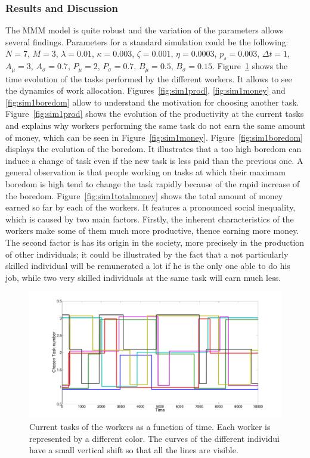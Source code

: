 \subsubsection{Results and Discussion}
The MMM model is quite robust and the variation of the parameters allows several findings. 
Parameters for a standard simulation could be the following: $N=7$, $M=3$, $\lambda=0.01$, $\kappa=0.003$, $\zeta=0.001$, $\eta=0.0003$, $p_s=0.003$, $\Delta t=1$, $A_\mu=3$, $A_\sigma=0.7$, $P_\mu=2$, $P_\sigma=0.7$, $B_\mu=0.5$, $B_\sigma=0.15$. Figure~\ref{fig:sim1task} shows the time evolution of the tasks performed by the different workers. It allows to see the dynamics of work allocation. Figures~\ref{fig:sim1prod}, \ref{fig:sim1money} and \ref{fig:sim1boredom} allow to understand the motivation for choosing another task. Figure~\ref{fig:sim1prod} shows the evolution of the productivity at the current tasks and explains why workers performing the same task do not earn the same amount of money, which can be seen in Figure~\ref{fig:sim1money}. Figure~\ref{fig:sim1boredom} displays the evolution of the boredom. It illustrates that a too high boredom can induce a change of task even if the new task is less paid than the previous one. A general observation is that people working on tasks at which their maximam boredom is high tend to change the task rapidly because of the rapid increase of the boredom. Figure~\ref{fig:sim1totalmoney} shows the total amount of money earned so far by each of the workers. It features a pronounced social inequality, which is caused by two main factors. Firstly, the inherent characteristics of the workers make some of them much more productive, thence earning more money. The second factor is has its origin in the society, more precisely in the production of other individuals; it could be illustrated by the fact that a not particularly skilled individual will be remunerated a lot if he is the only one able to do his job, while two very skilled individuals at the same task will earn much less.

\begin{figure}[h!]
	\centering
	\includegraphics[width=\textwidth]{../figures/taskno.pdf}
	\caption{Current tasks of the workers as a function of time. Each worker is represented by a different color. The curves of the different individui have a small vertical shift so that all the lines are visible.}
	\label{fig:sim1task}
\end{figure}

